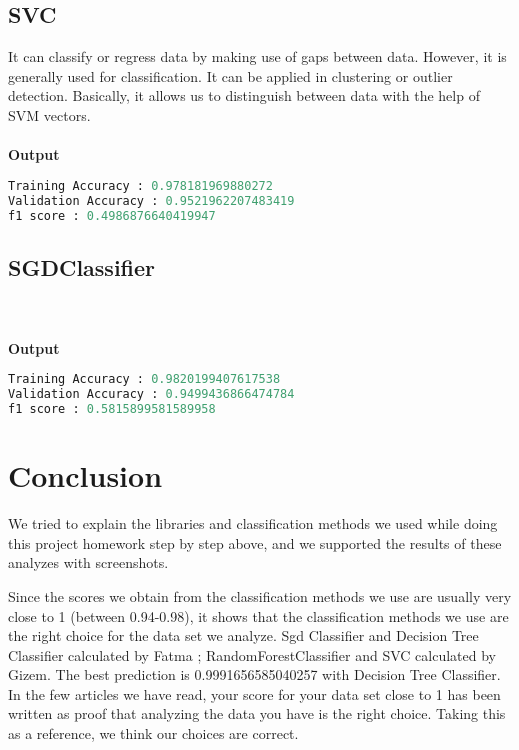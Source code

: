\documentclass[onecolumn]{article}
\begin{document}
\subsection{SVC}

It can classify or regress data by making use of gaps between data. However, it is generally used for classification. It can be applied in clustering or outlier detection. Basically, it allows us to distinguish between data with the help of SVM vectors.
\\\\
\textbf{Output}

\begin{lstlisting}[language=Python, caption= Accuracy ]
Training Accuracy : 0.978181969880272
Validation Accuracy : 0.9521962207483419
f1 score : 0.4986876640419947
\end{lstlisting}





\subsection{SGDClassifier}
\\\\
\textbf{Output}

\begin{lstlisting}[language=Python, caption= Accuracy ]
Training Accuracy : 0.9820199407617538
Validation Accuracy : 0.9499436866474784
f1 score : 0.5815899581589958
\end{lstlisting}

 

\section{Conclusion}


We tried to explain the libraries and classification methods we used while doing this project homework step by step above, and we supported the results of these analyzes with screenshots.

Since the scores we obtain from the classification methods we use are usually very close to 1 (between 0.94-0.98), it shows that the classification methods we use are the right choice for the data set we analyze. Sgd Classifier and Decision Tree Classifier calculated by Fatma ;   RandomForestClassifier and SVC calculated by Gizem. The best prediction is 0.9991656585040257 with  Decision Tree Classifier.
In the few articles we have read, your score for your data set close to 1 has been written as proof that analyzing the data you have is the right choice.
Taking this as a reference, we think our choices are correct.
\end{document}
